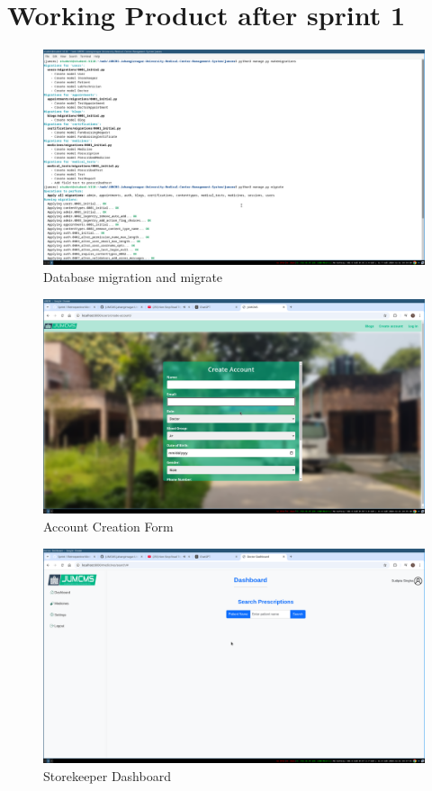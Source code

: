 \documentclass[a4paper,12pt]{article}
\begin{document}
\section{Working Product after sprint 1}
\begin{figure}[H]
    \centering
    \includegraphics[width=\textwidth]{images/spr1output1.png}
    \caption{Database migration and migrate}
\end{figure}

\begin{figure}[H]
    \centering
    \includegraphics[width=\textwidth]{images/spr1output2.png}
    \caption{Account Creation Form}
\end{figure}

\begin{figure}[H]
    \centering
    \includegraphics[width=\textwidth]{images/spr1output3.png}
    \caption{Storekeeper Dashboard}
\end{figure}
\end{document}
